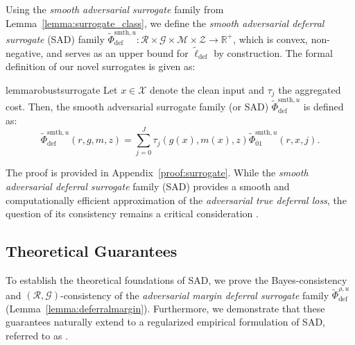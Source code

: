 Using the \textit{smooth adversarial surrogate} family from Lemma~\ref{lemma:surrogate_class}, we define the \textit{smooth adversarial deferral surrogate} (SAD) family \( \widetilde{\Phi}_{\text{def}}^{\text{smth}, u}: \mathcal{R} \times \mathcal{G} \times \mathcal{M} \times \mathcal{Z} \to \mathbb{R}^+ \), which is convex, non-negative, and serves as an upper bound for \( \widetilde{\ell}_{\text{def}} \) by construction. The formal definition of our novel surrogates is given as:


\begin{restatable}{lemma}{robustsurrogate} \label{lemma:surrogate}
Let \( x \in \mathcal{X} \) denote the clean input and \( \tau_j \) the aggregated cost. Then, the smooth adversarial surrogate family (or SAD)  $\widetilde{\Phi}^{\text{smth}, u}_{\text{def}}$ is defined as:
\begin{equation*}
\widetilde{\Phi}^{\text{smth}, u}_{\text{def}}(r,g,m,z) = \sum_{j=0}^J \tau_j(g(x),m(x),z)  \widetilde{\Phi}_{01}^{\text{smth}, u} (r,x, j).
\end{equation*}
\end{restatable}


The proof is provided in Appendix~\ref{proof:surrogate}. While the \textit{smooth adversarial deferral surrogate} family (SAD) provides a smooth and computationally efficient approximation of the \textit{adversarial true deferral loss}, the question of its consistency remains a critical consideration \citep{Statistical, bartlett1}. 




\subsection{Theoretical Guarantees}
To establish the theoretical foundations of SAD, we prove the Bayes-consistency and \((\mathcal{R}, \mathcal{G})\)-consistency of the \textit{adversarial margin deferral surrogate} family $\widetilde{\Phi}^{\rho, u}_{\text{def}}$ (Lemma~\ref{lemma:deferralmargin}). Furthermore, we demonstrate that these guarantees naturally extend to a regularized empirical formulation of SAD, referred to as \name.


